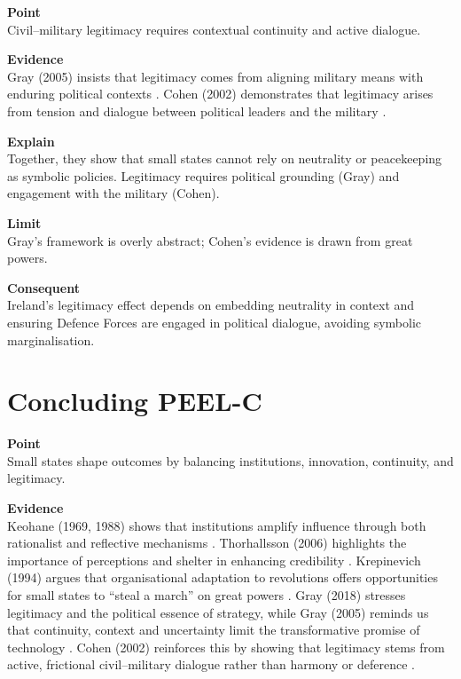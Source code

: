 \textbf{Point} \\
Civil--military legitimacy requires contextual continuity and active dialogue.

\textbf{Evidence} \\
Gray (2005) insists that legitimacy comes from aligning military means with enduring political contexts \parencite{GRAY_2005}.  
Cohen (2002) demonstrates that legitimacy arises from tension and dialogue between political leaders and the military \parencite{COHEN_2002}.  

\textbf{Explain} \\
Together, they show that small states cannot rely on neutrality or peacekeeping as symbolic policies. Legitimacy requires political grounding (Gray) and engagement with the military (Cohen).

\textbf{Limit} \\
Gray’s framework is overly abstract; Cohen’s evidence is drawn from great powers.

\textbf{Consequent} \\
Ireland’s legitimacy effect depends on embedding neutrality in context and ensuring Defence Forces are engaged in political dialogue, avoiding symbolic marginalisation.

\section*{Concluding PEEL-C}

\textbf{Point} \\
Small states shape outcomes by balancing institutions, innovation, continuity, and legitimacy.  

\textbf{Evidence} \\
Keohane (1969, 1988) shows that institutions amplify influence through both rationalist and reflective mechanisms \parencite{KEOHANE_1969,KEOHANE_1988}.  
Thorhallsson (2006) highlights the importance of perceptions and shelter in enhancing credibility \parencite{THORHALLSSON_2006}.  
Krepinevich (1994) argues that organisational adaptation to revolutions offers opportunities for small states to ``steal a march'' on great powers \parencite{KREPINEVICH_1994}.  
Gray (2018) stresses legitimacy and the political essence of strategy, while Gray (2005) reminds us that continuity, context and uncertainty limit the transformative promise of technology \parencite{GRAY_2018,GRAY_2005}.  
Cohen (2002) reinforces this by showing that legitimacy stems from active, frictional civil--military dialogue rather than harmony or deference \parencite{COHEN_2002}.  

